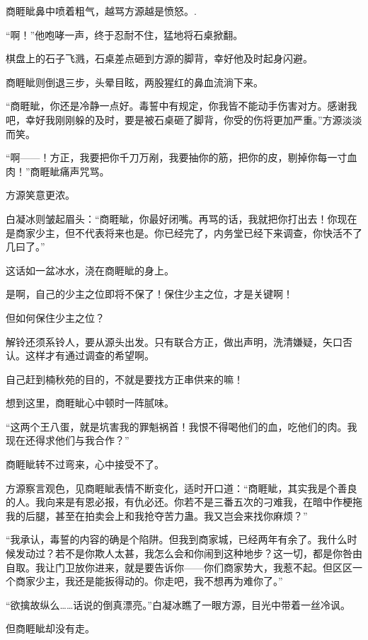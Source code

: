 
\begin{this_body}

商睚眦鼻中喷着粗气，越骂方源越是愤怒。.

“啊！”他咆哮一声，终于忍耐不住，猛地将石桌掀翻。

棋盘上的石子飞溅，石桌差点砸到方源的脚背，幸好他及时起身闪避。

商睚眦则倒退三步，头晕目眩，两股猩红的鼻血流淌下来。

“商睚眦，你还是冷静一点好。毒誓中有规定，你我皆不能动手伤害对方。感谢我吧，幸好我刚刚躲的及时，要是被石桌砸了脚背，你受的伤将更加严重。”方源淡淡而笑。

“啊——！方正，我要把你千刀万剐，我要抽你的筋，把你的皮，剔掉你每一寸血肉！”商睚眦痛声咒骂。

方源笑意更浓。

白凝冰则皱起眉头：“商睚眦，你最好闭嘴。再骂的话，我就把你打出去！你现在是商家少主，但不代表将来也是。你已经完了，内务堂已经下来调查，你快活不了几曰了。”

这话如一盆冰水，浇在商睚眦的身上。

是啊，自己的少主之位即将不保了！保住少主之位，才是关键啊！

但如何保住少主之位？

解铃还须系铃人，要从源头出发。只有联合方正，做出声明，洗清嫌疑，矢口否认。这样才有通过调查的希望啊。

自己赶到楠秋苑的目的，不就是要找方正串供来的嘛！

想到这里，商睚眦心中顿时一阵腻味。

“这两个王八蛋，就是坑害我的罪魁祸首！我恨不得喝他们的血，吃他们的肉。我现在还得求他们与我合作？”

商睚眦转不过弯来，心中接受不了。

方源察言观色，见商睚眦表情不断变化，适时开口道：“商睚眦，其实我是个善良的人。我向来是有恩必报，有仇必还。你若不是三番五次的刁难我，在暗中作梗拖我的后腿，甚至在拍卖会上和我抢夺苦力蛊。我又岂会来找你麻烦？”

“我承认，毒誓的内容的确是个陷阱。但我到商家城，已经两年有余了。我什么时候发动过？若不是你欺人太甚，我怎么会和你闹到这种地步？这一切，都是你咎由自取。我让门卫放你进来，就是要告诉你——你们商家势大，我惹不起。但区区一个商家少主，我还是能扳得动的。你走吧，我不想再为难你了。”

“欲擒故纵么……话说的倒真漂亮。”白凝冰瞧了一眼方源，目光中带着一丝冷讽。

但商睚眦却没有走。


\end{this_body}

